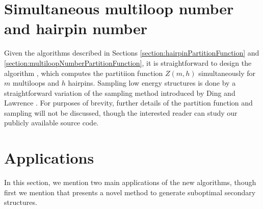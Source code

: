 \section{Simultaneous multiloop number and hairpin number}
\label{section:RNAhairpinml}

Given the algorithms described in Sections
\ref{section:hairpinPartitionFunction} and
\ref{section:multiloopNumberPartitionFunction}, it is straightforward
to design the algorithm {\rnahairpinml}, which computes the partitiion
function $Z(m,h)$ simultaneously for $m$ multiloops and $h$ hairpins.
Sampling low energy structures is done by a straightforward variation of
the sampling method introduced by Ding and Lawrence \citep{Ding.nar03}.
For purposes of brevity, further details of the partition function and
sampling will not be discussed, though the interested reader can study
our publicly available source code.

\section{Applications}
\label{section:applications}

In this section, we mention two main applications of the new algorithms,
though first we mention that {\rnahairpin} presents a novel method to
generate suboptimal secondary structures.


